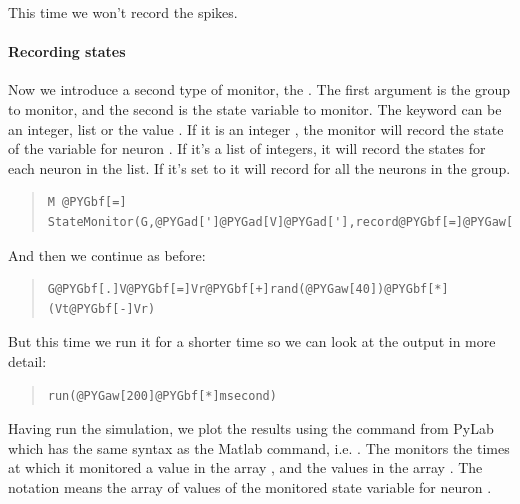 \documentclass[letterpaper,10pt,english]{manual}
\begin{document}
This time we won't record the spikes.


\paragraph{Recording states}

Now we introduce a second type of monitor, the \hyperlink{brian.StateMonitor}{}.
The first argument is the group to monitor, and the second is
the state variable to monitor. The keyword  can be
an integer, list or the value . If it is an integer ,
the monitor will record the state of the variable for neuron .
If it's a list of integers, it will record the states for
each neuron in the list. If it's set to  it will record
for all the neurons in the group.
\begin{quote}

\begin{Verbatim}[commandchars=@\[\]]
M @PYGbf[=] StateMonitor(G,@PYGad[']@PYGad[V]@PYGad['],record@PYGbf[=]@PYGaw[0])
\end{Verbatim}
\end{quote}

And then we continue as before:
\begin{quote}

\begin{Verbatim}[commandchars=@\[\]]
G@PYGbf[.]V@PYGbf[=]Vr@PYGbf[+]rand(@PYGaw[40])@PYGbf[*](Vt@PYGbf[-]Vr)
\end{Verbatim}
\end{quote}

But this time we run it for a shorter time so we can look at
the output in more detail:
\begin{quote}

\begin{Verbatim}[commandchars=@\[\]]
run(@PYGaw[200]@PYGbf[*]msecond)
\end{Verbatim}
\end{quote}

Having run the simulation, we plot the results using the
 command from PyLab which has the same syntax as the Matlab
 command, i.e. . The \hyperlink{brian.StateMonitor}{}
monitors the times at which it monitored a value in the
array , and the values in the array . The notation
 means the array of values of the monitored state
variable for neuron .
\end{document}
